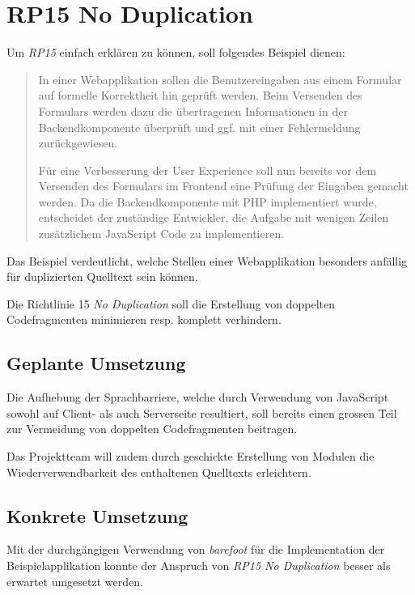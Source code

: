 \section{RP15 No Duplication}
\label{sec:principle-rp15-no-duplication}

Um \emph{RP15} einfach erklären zu können, soll folgendes Beispiel dienen:

\begin{quotation}
In einer Webapplikation sollen die Benutzereingaben aus einem Formular auf formelle Korrektheit hin geprüft werden. Beim Versenden des Formulars werden dazu die übertragenen Informationen in der Backendkomponente überprüft und ggf. mit einer Fehlermeldung zurückgewiesen.

Für eine Verbesserung der User Experience soll nun bereits vor dem Versenden des Formulars im Frontend eine Prüfung der Eingaben gemacht werden. Da die Backendkomponente mit PHP implementiert wurde, entscheidet der zuständige Entwickler, die Aufgabe mit wenigen Zeilen zusätzlichem JavaScript Code zu implementieren.
\end{quotation}

Das Beispiel verdeutlicht, welche Stellen einer Webapplikation besonders anfällig für duplizierten Quelltext sein können.

Die Richtlinie 15 \emph{No Duplication} soll die Erstellung von doppelten Codefragmenten minimieren resp. komplett verhindern.


\subsection*{Geplante Umsetzung}

Die Aufhebung der Sprachbarriere, welche durch Verwendung von JavaScript sowohl auf Client- als auch Serverseite resultiert, soll bereits einen grossen Teil zur Vermeidung von doppelten Codefragmenten beitragen.

Das Projektteam will zudem durch geschickte Erstellung von Modulen die Wiederverwendbarkeit des enthaltenen Quelltexts erleichtern.


\subsection*{Konkrete Umsetzung}

Mit der durchgängigen Verwendung von \emph{barefoot} \cite{Barefoot} für die Implementation der Beispielapplikation konnte der Anspruch von \emph{RP15 No Duplication} besser als erwartet umgesetzt werden.

